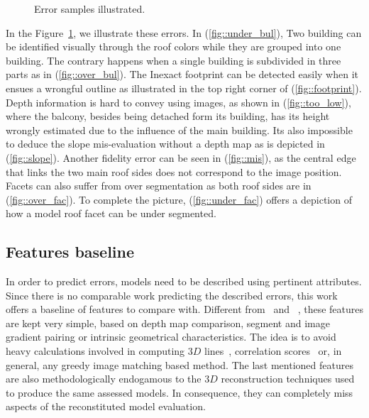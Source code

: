 \documentclass[runningheads]{llncs}
\newcounter{SubFigCounter}
\begin{document}
\begin{figure}[H]
\begin{center}
{{                    \label{fig::fac_err}
                    \addtocounter{figure}{-1}
                }
            }
            {
                \caption{\label{fig::samples}Error samples illustrated.}
            }
        \end{center}
    \end{figure}

    In the Figure~\ref{fig::samples}, we illustrate these errors. In (\ref{fig::under_bul}), Two building can be identified visually through the roof colors while they are grouped into one building. The contrary happens when a single building is subdivided in three parts as in (\ref{fig::over_bul}). The Inexact footprint can be detected easily when it ensues a wrongful outline as illustrated in the top right corner of (\ref{fig::footprint}). Depth information is hard to convey using images, as shown in (\ref{fig::too_low}), where the balcony, besides being detached form its building, has its height wrongly estimated due to the influence of the main building. Its also impossible to deduce the slope mis-evaluation without a depth map as is depicted in (\ref{fig::slope}). Another fidelity error can be seen in (\ref{fig::mis}), as the central edge that links the two main roof sides does not correspond to the image position. Facets can also suffer from over segmentation as both roof sides are in (\ref{fig::over_fac}). To complete the picture, (\ref{fig::under_fac}) offers a depiction of how a model roof facet can be under segmented.

\subsection{Features baseline}
In order to predict errors, models need to be described using pertinent attributes. Since there is no comparable work predicting the described errors, this work offers a baseline of features to compare with. Different from~\cite{boudet2006supervised} and ~\cite{Michelin2013}, these features are kept very simple, based on depth map comparison, segment and image gradient pairing or intrinsic geometrical characteristics. The idea is to avoid heavy calculations involved in computing $3D$ lines~\cite{Michelin2013}, correlation scores~\cite{boudet2006supervised} or, in general, any greedy image matching based method. The last mentioned features are also methodologically endogamous to the $3D$ reconstruction techniques used to produce the same assessed models. In consequence, they can completely miss aspects of the reconstituted model evaluation.
\end{document}
